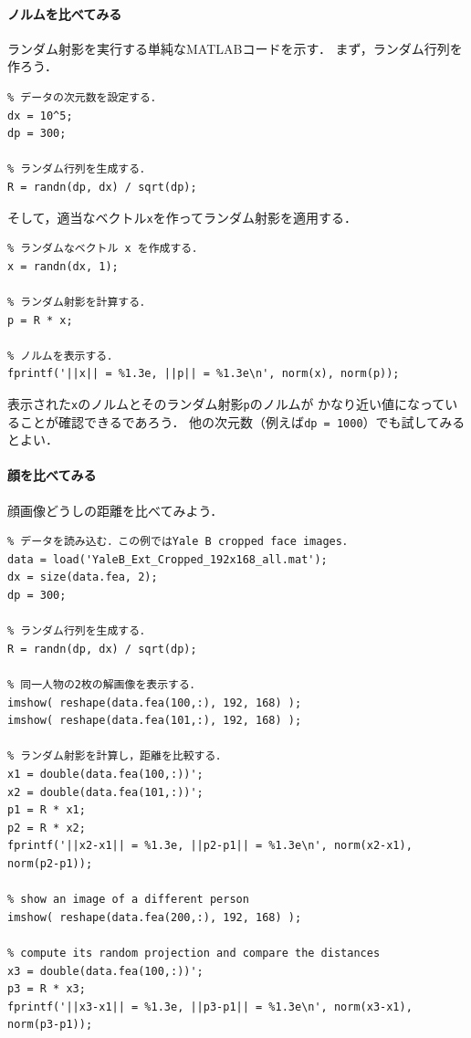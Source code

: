 
\lstset{language=Matlab}
\lstset{tabsize=2,showstringspaces=false}
\lstset{flexiblecolumns=true}
\lstset{framesep=2ex}
\lstset{xleftmargin=8ex,xrightmargin=16ex}

\paragraph{ノルムを比べてみる}
ランダム射影を実行する単純なMATLABコードを示す．
まず，ランダム行列を作ろう．
\begin{lstlisting}
% データの次元数を設定する．
dx = 10^5;
dp = 300;

% ランダム行列を生成する．
R = randn(dp, dx) / sqrt(dp);
\end{lstlisting}
そして，適当なベクトル{\tt x}を作ってランダム射影を適用する．
\begin{lstlisting}
% ランダムなベクトル x を作成する．
x = randn(dx, 1);

% ランダム射影を計算する．
p = R * x;

% ノルムを表示する．
fprintf('||x|| = %1.3e, ||p|| = %1.3e\n', norm(x), norm(p));
\end{lstlisting}

表示された{\tt x}のノルムとそのランダム射影{\tt p}のノルムが
かなり近い値になっていることが確認できるであろう．
他の次元数（例えば{\tt dp = 1000}）でも試してみるとよい．


\paragraph{顔を比べてみる}

顔画像どうしの距離を比べてみよう．
\begin{lstlisting}
% データを読み込む．この例ではYale B cropped face images．
data = load('YaleB_Ext_Cropped_192x168_all.mat');
dx = size(data.fea, 2);
dp = 300;

% ランダム行列を生成する．
R = randn(dp, dx) / sqrt(dp);

% 同一人物の2枚の解画像を表示する．
imshow( reshape(data.fea(100,:), 192, 168) );
imshow( reshape(data.fea(101,:), 192, 168) );

% ランダム射影を計算し，距離を比較する．
x1 = double(data.fea(100,:))';
x2 = double(data.fea(101,:))';
p1 = R * x1;
p2 = R * x2;
fprintf('||x2-x1|| = %1.3e, ||p2-p1|| = %1.3e\n', norm(x2-x1), norm(p2-p1));

% show an image of a different person
imshow( reshape(data.fea(200,:), 192, 168) );

% compute its random projection and compare the distances
x3 = double(data.fea(100,:))';
p3 = R * x3;
fprintf('||x3-x1|| = %1.3e, ||p3-p1|| = %1.3e\n', norm(x3-x1), norm(p3-p1));
\end{lstlisting}


